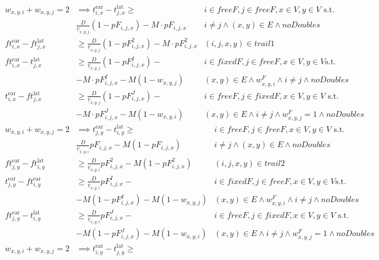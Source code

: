 \documentclass[../thesis.tex]{subfiles}
\begin{document}
{\begin{align}
w_{x,y,i} + w_{x,y,j} = 2& \implies t^\text{ear}_{i,x}-t^\text{lat}_{j,x} \geq
& i\in freeF,j \in freeF,x\in V, y \in V\text{ s.t. }\nonumber\\
& \frac D{\underline v_{x,y,j}} (1-pF_{i,j,x}) - M \cdot pF_{i,j,x}
& i\neq j\land (x,y)\in E\land noDoubles\\
ft^\text{ear}_{i,x}-ft^\text{lat}_{j,x}&\geq \frac D {\underline v_{x,y,j}}(1-pF^2_{i,j,x}) - M\cdot pF^2_{i,j,x} & (i,j,x,y)\in trail1\\
ft^\text{ear}_{i,x}- t^\text{lat}_{j,x} &\geq \frac D{\underline v_{x,y,j}} (1-pF^I_{i,j,x}) - &
i \in fixedF,j\in freeF,x\in V,y\in V\text{s.t.}\nonumber\\
&-M\cdot pF^I_{i,j,x} - M(1-w_{x,y,j})&
(x,y)\in E\land  w^F_{x,y,i}\land i\neq j\land noDoubles\\
t^\text{ear}_{i,x}-ft^\text{lat}_{j,x}&\geq \frac D{\underline v_{x,y,j}} (1-pF^J_{i,j,x}) - & i\in freeF,j \in fixedF,x\in V,y\in V\text{ s.t. }
\nonumber\\&
-M\cdot pF^J_{i,j,x} -M (1-w_{x,y,i})
& (x,y)\in E\land i\neq j\land w^F_{x,y,j}=1\land noDoubles
\end{align}
\begin{align}
w_{x,y,i} + w_{x,y,j} = 2& \implies t^\text{ear}_{j,y}-t^\text{lat}_{i,y} \geq
& i\in freeF,j \in freeF,x\in V,y \in V\text{ s.t. } \nonumber\\& 
\frac D{\underline v_{x,y,i}} pF_{i,j,x} - M(1-pF_{i,j,x}) 
& i\neq j\land (x,y)\in E\land noDoubles\\
ft^\text{ear}_{j,y}-ft^\text{lat}_{i,y}&\geq \frac D {\underline v_{x,y,i}}pF^2_{i,j,x} - M(1-pF^2_{i,j,x}) & (i,j,x,y)\in trail2\\
t^\text{ear}_{j,y}- ft^\text{ear}_{i,y} &
\geq \frac D{\underline v_{x,y,i}} pF^I_{i,j,x} - &
i \in fixedF,j\in freeF,x\in V,y\in V\text{s.t.}\nonumber\\&
-M (1-pF^I_{i,j,x}) - M(1-w_{x,y,j})&
(x,y)\in E\land  w^F_{x,y,i}\land i\neq j\land noDoubles\\
ft^\text{ear}_{j,y}-t^\text{lat}_{i,y}&\geq \frac D{\underline v_{x,y,i}} pF^J_{i,j,x} - & i\in freeF,j \in fixedF,x\in V,y\in V\text{ s.t. }
\nonumber\\&
-M (1-pF^J_{i,j,x}) -M (1-w_{x,y,i})
& (x,y)\in E\land i\neq j\land w^F_{x,y,j}=1\land noDoubles\\
w_{x,y,i} + w_{x,y,j} = 2& \implies t^\text{ear}_{i,y}-t^\text{lat}_{j,y} \geq

\end{align}}
\end{document}
